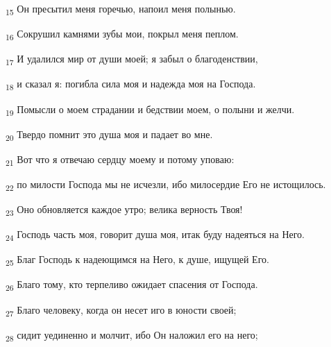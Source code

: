 \begin{tcolorbox}
\textsubscript{15} Он пресытил меня горечью, напоил меня полынью.
\end{tcolorbox}
\begin{tcolorbox}
\textsubscript{16} Сокрушил камнями зубы мои, покрыл меня пеплом.
\end{tcolorbox}
\begin{tcolorbox}
\textsubscript{17} И удалился мир от души моей; я забыл о благоденствии,
\end{tcolorbox}
\begin{tcolorbox}
\textsubscript{18} и сказал я: погибла сила моя и надежда моя на Господа.
\end{tcolorbox}
\begin{tcolorbox}
\textsubscript{19} Помысли о моем страдании и бедствии моем, о полыни и желчи.
\end{tcolorbox}
\begin{tcolorbox}
\textsubscript{20} Твердо помнит это душа моя и падает во мне.
\end{tcolorbox}
\begin{tcolorbox}
\textsubscript{21} Вот что я отвечаю сердцу моему и потому уповаю:
\end{tcolorbox}
\begin{tcolorbox}
\textsubscript{22} по милости Господа мы не исчезли, ибо милосердие Его не истощилось.
\end{tcolorbox}
\begin{tcolorbox}
\textsubscript{23} Оно обновляется каждое утро; велика верность Твоя!
\end{tcolorbox}
\begin{tcolorbox}
\textsubscript{24} Господь часть моя, говорит душа моя, итак буду надеяться на Него.
\end{tcolorbox}
\begin{tcolorbox}
\textsubscript{25} Благ Господь к надеющимся на Него, к душе, ищущей Его.
\end{tcolorbox}
\begin{tcolorbox}
\textsubscript{26} Благо тому, кто терпеливо ожидает спасения от Господа.
\end{tcolorbox}
\begin{tcolorbox}
\textsubscript{27} Благо человеку, когда он несет иго в юности своей;
\end{tcolorbox}
\begin{tcolorbox}
\textsubscript{28} сидит уединенно и молчит, ибо Он наложил его на него;
\end{tcolorbox}
